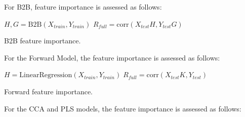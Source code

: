 For B2B, feature importance is assessed as follows:

\begin{algorithm}[H]
      $H, G = \text{B2B}(X_{train}, Y_{train})$\;
$R_{full} = \text{corr}(X_{test} H, Y_{test} G)$\;

 \caption{B2B feature importance.} \label{algorithm:b2b_fi}
\end{algorithm}

For the Forward Model, the feature importance is assessed as follows:

\begin{algorithm}[H]
     

$H = \text{LinearRegression}(X_{train}, Y_{train})\;
R_{full} = \text{corr}(X_{test} K, Y_{test})$\;

     
\caption{Forward feature importance.} \label{algorithm:fwd_fi} \end{algorithm}


For the CCA and PLS models, the feature importance is assessed as follows:

